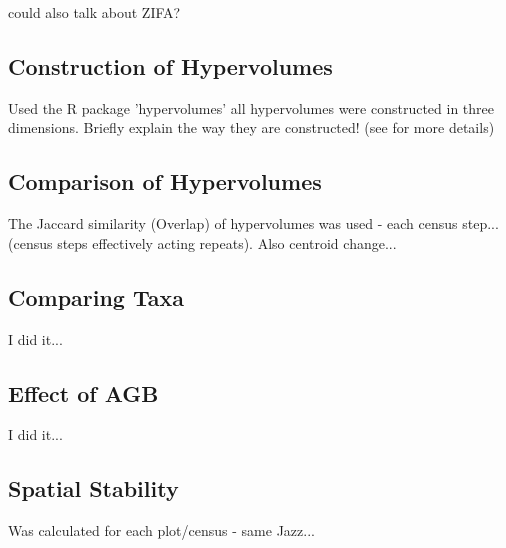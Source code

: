 	could also talk about ZIFA?
	
\subsection{Construction of Hypervolumes}
	Used the R package 'hypervolumes' \citep{Blonder2017a}
	all hypervolumes were constructed in three dimensions.
	Briefly explain the way they are constructed! (see \cite{Blonder2014, Blonder2017b} for more details)

\subsection{Comparison of Hypervolumes}
The Jaccard similarity (Overlap) of hypervolumes was used - each census step... (census steps effectively acting repeats).
Also centroid change...

\subsection{Comparing Taxa}
I did it...

\subsection{Effect of AGB}
I did it...

\subsection{Spatial Stability}
Was calculated for each plot/census - same Jazz...
